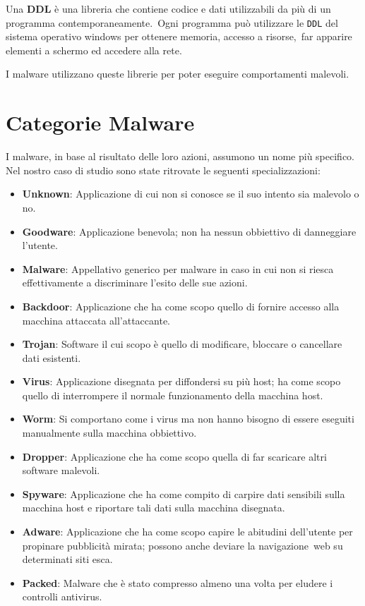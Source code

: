 Una \textbf{DDL} è una libreria che contiene codice e dati utilizzabili da più di un programma contemporaneamente.\
Ogni programma può utilizzare le \texttt{DDL} del sistema operativo windows per ottenere memoria, accesso a risorse,\
far apparire elementi a schermo ed accedere alla rete\cite{Microsoft-DLL}.

I malware utilizzano queste librerie per poter eseguire comportamenti malevoli.

\section{Categorie Malware}

I malware, in base al risultato delle loro azioni, assumono un nome più specifico. Nel nostro caso di studio sono state ritrovate le seguenti specializzazioni:
\begin{itemize}
      \item \textbf{Unknown}: Applicazione di cui non si conosce se il suo intento sia malevolo o no.
      \item \textbf{Goodware}: Applicazione benevola; non ha nessun obbiettivo di danneggiare l'utente.
      \item \textbf{Malware}: Appellativo generico per malware in caso in cui non si riesca effettivamente a discriminare l'esito delle sue azioni.
      \item \textbf{Backdoor}: Applicazione che ha come scopo quello di fornire accesso alla macchina attaccata all'attaccante\cite{Kaspersky-malware_backdoor}.
      \item \textbf{Trojan}: Software il cui scopo è quello di modificare, bloccare o cancellare dati esistenti\cite{Cisco-Malware_Taxonomy}.
      \item \textbf{Virus}: Applicazione disegnata per diffondersi su più host; ha come scopo quello di interrompere il normale funzionamento della macchina host\cite{Cisco-Malware_Taxonomy}.
      \item \textbf{Worm}: Si comportano come i virus ma non hanno bisogno di essere eseguiti manualmente sulla macchina obbiettivo\cite{Cisco-Malware_Taxonomy}.
      \item \textbf{Dropper}: Applicazione che ha come scopo quella di far scaricare altri software malevoli\cite{Kaspersky-malware_dropper}.
      \item \textbf{Spyware}: Applicazione che ha come compito di carpire dati sensibili sulla macchina host e riportare tali dati sulla macchina disegnata\cite{Cisco-Malware_Taxonomy}.
      \item \textbf{Adware}: Applicazione che ha come scopo capire le abitudini dell'utente per propinare pubblicità mirata; possono anche deviare la navigazione\
            web su determinati siti esca\cite{Cisco-Malware_Taxonomy}.
      \item \textbf{Packed}: Malware che è stato compresso almeno una volta per eludere i controlli antivirus\cite{Kaspersky-malware_MultiPacked}.
\end{itemize}

